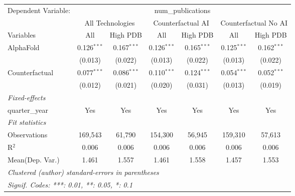 \begingroup
\centering
\begin{tabular}{lcccccc}
   \tabularnewline \midrule \midrule
   Dependent Variable: & \multicolumn{6}{c}{num\_publications}\\
 & \multicolumn{2}{c}{All Technologies} & \multicolumn{2}{c}{Counterfactual AI} & \multicolumn{2}{c}{Counterfactual No AI} \\
\cmidrule(lr){1-1}\cmidrule(lr){2-3} \cmidrule(lr){4-5} \cmidrule(lr){6-7}
Variables & \multicolumn{1}{c}{All} & \multicolumn{1}{c}{High PDB} & \multicolumn{1}{c}{All} & \multicolumn{1}{c}{High PDB} & \multicolumn{1}{c}{All} & \multicolumn{1}{c}{High PDB} \\
\cmidrule(lr){1-1}\cmidrule(lr){2-2} \cmidrule(lr){3-3} \cmidrule(lr){4-4} \cmidrule(lr){5-5} \cmidrule(lr){6-6} \cmidrule(lr){7-7}
   AlphaFold      & 0.126$^{***}$ & 0.167$^{***}$ & 0.126$^{***}$ & 0.165$^{***}$ & 0.125$^{***}$ & 0.162$^{***}$\\   
                  & (0.013)       & (0.022)       & (0.013)       & (0.022)       & (0.013)       & (0.022)\\   
   Counterfactual & 0.077$^{***}$ & 0.086$^{***}$ & 0.110$^{***}$ & 0.124$^{***}$ & 0.054$^{***}$ & 0.052$^{***}$\\   
                  & (0.012)       & (0.021)       & (0.020)       & (0.031)       & (0.013)       & (0.019)\\   
   \midrule
   \emph{Fixed-effects}\\
   quarter\_year  & Yes           & Yes           & Yes           & Yes           & Yes           & Yes\\  
   \midrule
   \emph{Fit statistics}\\
   Observations   & 169,543       & 61,790        & 154,300       & 56,945        & 159,310       & 57,613\\  
   R$^2$          & 0.006         & 0.006         & 0.006         & 0.006         & 0.006         & 0.006\\  
Mean(Dep. Var.) & 1.461 & 1.557 & 1.461 & 1.558 & 1.457 & 1.553 \\
   \midrule \midrule
   \multicolumn{7}{l}{\emph{Clustered (author) standard-errors in parentheses}}\\
   \multicolumn{7}{l}{\emph{Signif. Codes: ***: 0.01, **: 0.05, *: 0.1}}\\
\end{tabular}
\par\endgroup
